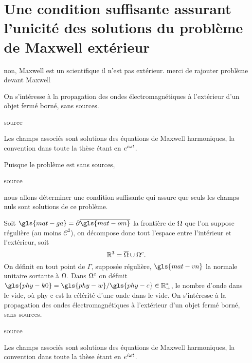 \section[Une CSU des solutions du problème de Maxwell extérieur]{Une condition suffisante assurant l'unicité des solutions du problème de Maxwell extérieur}
\begin{REM}
  non, Maxwell est un scientifique il n'est pas extérieur. merci de rajouter problème devant Maxwell
\end{REM}
  On s’intéresse à la propagation des ondes électromagnétiques à l'extérieur d'un objet fermé borné, sans sources.
  \begin{REM}
  source
\end{REM}
  Les champs associés sont solutions des équations de Maxwell harmoniques, la convention dans toute la thèse étant en \(e^{i\omega t}\). 


  Puisque le problème est sans sources,
  \begin{REM}
  source
\end{REM} nous allons déterminer une condition suffisante qui assure que seuls les champs nuls sont solutions de ce problème.


  Soit \(\gls{mat-ga}=\partial\overline{\gls{mat-om}}\) la frontière de \(\Omega\) que l'on suppose régulière (au moins \(\mathcal{C}^2\)), on décompose donc tout l'espace entre l'intérieur et l'extérieur, soit 
  \[
    \mathbb R^3 = \overline{\Omega}\cup{\Omega}^c.
  \]
  On définit en tout point de \(\Gamma\), supposée régulière, \(\gls{mat-vn}\) la normale unitaire sortante à \(\Omega\).
  Dans \(\Omega^c\) on définit \(\gls{phy-k0}=\gls{phy-w} / \gls{phy-c} \in \RR_+^*\), le nombre d'onde dans le vide, où \gls{phy-c} 
  est la célérité d'une onde dans le vide.
  On s’intéresse à la propagation des ondes électromagnétiques à l'extérieur d'un objet fermé borné, sans sources.
  \begin{REM}
  source
\end{REM}
  Les champs associés sont solutions des équations de Maxwell harmoniques, la convention dans toute la thèse étant en \(e^{i\omega t}\). 

